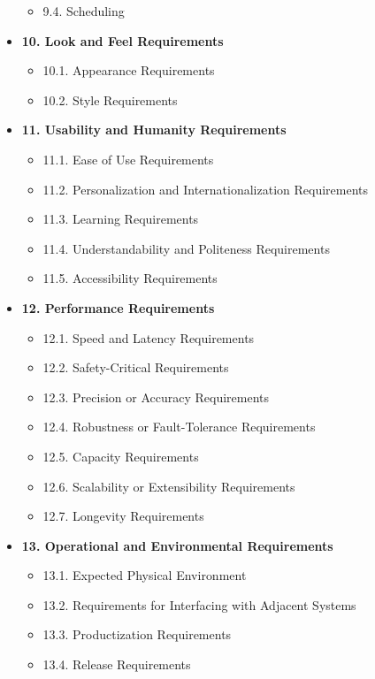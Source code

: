 \documentclass[12pt, titlepage]{article}
\begin{document}
\begin{itemize}
\begin{itemize}
        \item 9.4. Scheduling
    \end{itemize}
        \item \textbf{10. Look and Feel Requirements}
    \begin{itemize}
        \item 10.1. Appearance Requirements
        \item 10.2. Style Requirements
    \end{itemize}
    \item \textbf{11. Usability and Humanity Requirements}
    \begin{itemize}
        \item 11.1. Ease of Use Requirements
        \item 11.2. Personalization and Internationalization Requirements
        \item 11.3. Learning Requirements
        \item 11.4. Understandability and Politeness Requirements
        \item 11.5. Accessibility Requirements
    \end{itemize}
    \item \textbf{12. Performance Requirements}
    \begin{itemize}
        \item 12.1. Speed and Latency Requirements
        \item 12.2. Safety-Critical Requirements
        \item 12.3. Precision or Accuracy Requirements
        \item 12.4. Robustness or Fault-Tolerance Requirements
        \item 12.5. Capacity Requirements
        \item 12.6. Scalability or Extensibility Requirements
        \item 12.7. Longevity Requirements
    \end{itemize}
    \item \textbf{13. Operational and Environmental Requirements}
    \begin{itemize}
        \item 13.1. Expected Physical Environment
        \item 13.2. Requirements for Interfacing with Adjacent Systems
        \item 13.3. Productization Requirements
        \item 13.4. Release Requirements
    \end{itemize}

\end{itemize}
\end{document}
